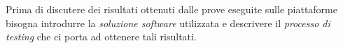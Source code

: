 Prima di discutere dei risultati ottenuti dalle prove eseguite sulle piattaforme bisogna introdurre la \textit{soluzione software} utilizzata e descrivere il \textit{processo di testing} che ci porta ad ottenere tali risultati.
